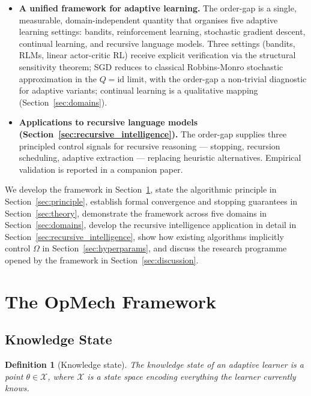 \documentclass[12pt,a4paper]{article}
\newtheorem{definition}{Definition}[section]
\newcommand{\X}{\mathcal{X}}
\newcommand{\Ogap}{\Omega}
\begin{document}
\begin{itemize}
\item \textbf{A unified framework for adaptive learning.}
      The order-gap is a single, measurable, domain-independent quantity
      that organises five adaptive learning settings: bandits,
      reinforcement learning, stochastic gradient descent, continual
      learning, and recursive language models.
      Three settings (bandits, RLMs, linear actor-critic RL) receive
      explicit verification via the structural sensitivity theorem; SGD
      reduces to classical Robbins-Monro stochastic approximation in the
      $Q = \mathrm{id}$ limit, with the order-gap a non-trivial diagnostic
      for adaptive variants; continual learning is a qualitative mapping
      (Section~\ref{sec:domains}).

\item \textbf{Applications to recursive language models
      (Section~\ref{sec:recursive_intelligence}).}
      The order-gap supplies three principled control signals for recursive
      reasoning — stopping, recursion scheduling, adaptive extraction —
      replacing heuristic alternatives. Empirical validation is reported
      in a companion paper.
\end{itemize}

We develop the framework in Section~\ref{sec:framework}, state the
algorithmic principle in Section~\ref{sec:principle}, establish formal
convergence and stopping guarantees in Section~\ref{sec:theory}, demonstrate
the framework across five domains in Section~\ref{sec:domains}, develop the
recursive intelligence application in detail in
Section~\ref{sec:recursive_intelligence}, show how existing algorithms
implicitly control $\Ogap$ in Section~\ref{sec:hyperparams}, and discuss the
research programme opened by the framework in Section~\ref{sec:discussion}.

\section{The OpMech Framework}
\label{sec:framework}

\subsection{Knowledge State}
\label{sec:state}

\begin{definition}[Knowledge state]
\label{def:knowledge_state}
The \emph{knowledge state} of an adaptive learner is a point $\theta \in \X$,
where $\X$ is a state space encoding everything the learner currently knows.
\end{definition}
\end{document}
